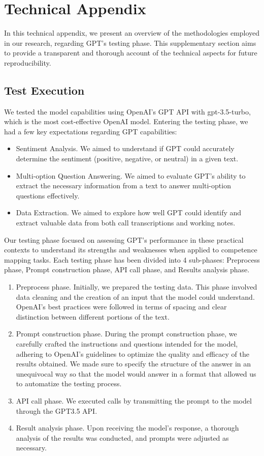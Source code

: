 \chapter{Technical Appendix}
\label{sec:techappendix}
In this technical appendix, we present an overview of the methodologies employed in our research, regarding GPT's testing phase. This supplementary section aims to provide a transparent and thorough account of the technical aspects for future reproducibility.

\section{Test Execution}
We tested the model capabilities using OpenAI's GPT API with gpt-3.5-turbo, which is the most cost-effective OpenAI model. Entering the testing phase, we had a few key expectations regarding GPT capabilities:
\begin{itemize}
      \item Sentiment Analysis. We aimed to understand if GPT could accurately determine the sentiment (positive, negative, or neutral) in a given text.
      \item Multi-option Question Answering. We aimed to evaluate GPT's ability to extract the necessary information from a text to answer multi-option questions effectively.
      \item Data Extraction. We aimed to explore how well GPT could identify and extract valuable data from both call transcriptions and working notes.
\end{itemize}
Our testing phase focused on assessing GPT's performance in these practical contexts to understand its strengths and weaknesses when applied to competence mapping tasks. Each testing phase has been divided into 4 sub-phases: Preprocess phase, Prompt construction phase, API call phase, and Results analysis phase.
\begin{enumerate}
      \item Preprocess phase. Initially, we prepared the testing data. This phase involved data cleaning and the creation of an input that the model could understand. OpenAI's best practices were followed in terms of spacing and clear distinction between different portions of the text.
      \item Prompt construction phase. During the prompt construction phase, we carefully crafted the instructions and questions intended for the model, adhering to OpenAI's guidelines to optimize the quality and efficacy of the results obtained. We made sure to specify the structure of the answer in an unequivocal way so that the model would answer in a format that allowed us to automatize the testing process.
      \item API call phase. We executed calls by transmitting the prompt to the model through the GPT3.5 API.
      \item Result analysis phase. Upon receiving the model's response, a thorough analysis of the results was conducted, and prompts were adjusted as necessary.
\end{enumerate}

